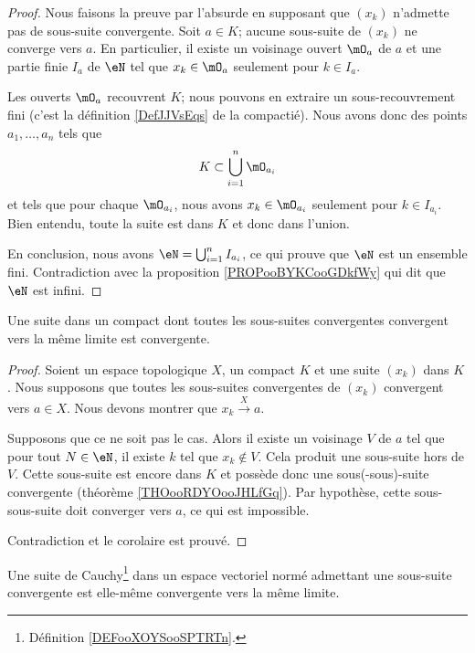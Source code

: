 \begin{proof}
	Nous faisons la preuve par l'absurde en supposant que \( (x_k)\) n'admette pas de sous-suite convergente. Soit \( a\in K\); aucune sous-suite de \( (x_k)\) ne converge vers \( a\). En particulier, il existe un voisinage ouvert \( \mO_a\) de \( a\) et une partie finie \( I_a\) de \( \eN\) tel que \( x_k\in \mO_a\) seulement pour \( k\in I_a\).

	Les ouverts \( \mO_a\) recouvrent \( K\); nous pouvons en extraire un sous-recouvrement fini (c'est la définition \ref{DefJJVsEqs} de la compactié). Nous avons donc des points \( a_1,\ldots, a_n\) tels que
	\begin{equation}
		K\subset \bigcup_{i=1}^n\mO_{a_i}
	\end{equation}
	et tels que pour chaque \( \mO_{a_i}\), nous avons \( x_k\in \mO_{a_i}\) seulement pour \( k\in I_{a_i}\). Bien entendu, toute la suite est dans \( K\) et donc dans l'union.

	En conclusion, nous avons \( \eN=\bigcup_{i=1}^n I_{a_i}\), ce qui prouve que \( \eN\) est un ensemble fini. Contradiction avec la proposition \ref{PROPooBYKCooGDkfWy} qui dit que \( \eN\) est infini.
\end{proof}

\begin{corollary}        \label{CORooBTIPooUYWucb}
	Une suite dans un compact dont toutes les sous-suites convergentes convergent vers la même limite est convergente.
\end{corollary}

\begin{proof}
	Soient un espace topologique \( X\), un compact \( K\) et une suite \( (x_k)\) dans \( K\). Nous supposons que toutes les sous-suites convergentes de \( (x_k)\) convergent vers \( a\in X\). Nous devons montrer que \( x_k\stackrel{X}{\longrightarrow}a\).

	Supposons que ce ne soit pas le cas. Alors il existe un voisinage \( V\) de \( a\) tel que pour tout \( N\in \eN\), il existe \( k\) tel que \( x_k\notin V\). Cela produit une sous-suite hors de \( V\). Cette sous-suite est encore dans \( K\) et possède donc une sous(-sous)-suite convergente (théorème \ref{THOooRDYOooJHLfGq}). Par hypothèse, cette sous-sous-suite doit converger vers \( a\), ce qui est impossible.

	Contradiction et le corolaire est prouvé.
\end{proof}

\begin{lemma}
	Une suite de Cauchy\footnote{Définition \ref{DEFooXOYSooSPTRTn}.} dans un espace vectoriel normé admettant une sous-suite convergente est elle-même convergente vers la même limite.
\end{lemma}

